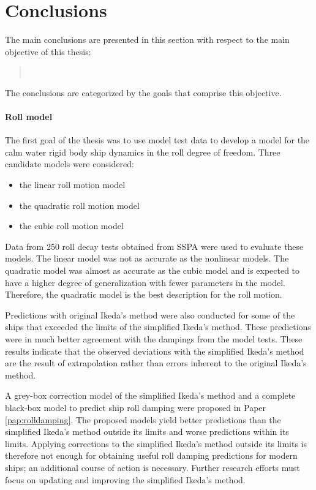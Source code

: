 \chapter{Conclusions\label{ch:conclusions}}
The main conclusions are presented in this section with respect to the main objective of this thesis:
\begin{quote} 
\vspace{0.1cm}
\expandafter\MakeUppercase \objective \\
\vspace{-0.3cm}
\end{quote}
\noindent The conclusions are categorized by the goals that comprise this objective.

\subsubsection*{\normalfont \color{black} \textbf{Roll model}}
The first goal of the thesis was to use model test data to develop a model for the calm water rigid body ship dynamics in the roll degree of freedom. 
Three candidate models were considered: 
\begin{itemize}
    \item the linear roll motion model
    \item the quadratic roll motion model
    \item the cubic roll motion model
\end{itemize}
\noindent Data from 250 roll decay tests obtained from SSPA were used to evaluate these models. The linear model was not as accurate as the nonlinear models. The quadratic model was almost as accurate as the cubic model and is expected to have a higher degree of generalization with fewer parameters in the model. Therefore,  the quadratic model is the best description for the roll motion. 

Predictions with original Ikeda's method were also conducted for some of the ships that exceeded the limits of the simplified Ikeda's method. These predictions were in much better agreement with the dampings from the model tests. These results indicate that the observed deviations with the simplified Ikeda's method are the result of extrapolation rather than errors inherent 
to the original Ikeda's method.

A grey-box correction model of the simplified Ikeda's method and a complete black-box model to predict ship roll damping were proposed in Paper \ref{pap:rolldamping}. The proposed models yield better predictions than the simplified Ikeda's method outside its limits and worse predictions within its limits. Applying corrections to the simplified Ikeda's method outside its limits is therefore not enough for obtaining useful roll damping predictions for modern ships; an additional course of action is necessary. Further research efforts must focus on updating and improving the simplified Ikeda's method.

